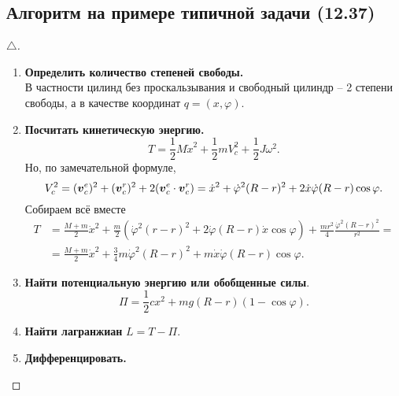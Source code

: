 \subsection{Алгоритм на примере типичной задачи (12.37)}
\begin{proof}[$\triangle$]
    \begin{minipage}[t]{0.9\textwidth}
        \begin{enumerate}[label = \Roman*.]
            \item \textbf{Определить количество степеней свободы.} \\
            В частности цилинд без проскальзывания и свободный цилиндр -- 2 степени свободы, а в качестве координат $q = (x, \varphi)$.
            \item \textbf{Посчитать кинетическую энергию.}
            \begin{equation*}
                T = \frac{1}{2} M \dot{x}^2 + \frac{1}{2} m V_c^2 + \frac{1}{2} J \omega^2.               
            \end{equation*}
            Но, по замечательной формуле,
            \begin{equation*}
                V_c^2 = (\mbox{\boldmath $v$}^e_c)^2 + (\mbox{\boldmath $v$}^r_c)^2 + 2 (\mbox{\boldmath $v$}_c^e \cdot \mbox{\boldmath $v$}_c^r) =
                \dot{x}^2 + \dot{\varphi}^2 (R-r)^2 + 2 \dot{x} \dot{\varphi} (R- r) \cos \varphi.
            \end{equation*}
            Собираем всё вместе
            \begin{align*}
                T &= 
                \frac{M + m}{2} \dot{x}^2 + \frac{m}{2} \left(
                    \dot{\varphi}^2 (r-r)^2 + 2 \dot{\varphi} (R-r) \dot{x} \cos \varphi
                \right) +
                \frac{mr^2}{4} \frac{\dot{\varphi}^2 (R-r)^2}{r^2} = \\
                &= \frac{M+m}{2} \dot{x}^2 + \frac{3}{4} m \dot{\varphi}^2 (R-r)^2 + m \dot{x} \dot{\varphi} (R-r) \cos \varphi.
            \end{align*}
            \item \textbf{Найти потенциальную энергию или обобщенные силы}. \\
            \begin{equation*}
                \Pi = \frac{1}{2} cx^2 + mg (R-r) (1 - \cos \varphi).
            \end{equation*}
            \item \textbf{Найти лагранжиан} $L = T - \Pi$.
            \item \textbf{Дифференцировать.} \\

\end{enumerate}
\end{minipage}
\end{proof}
